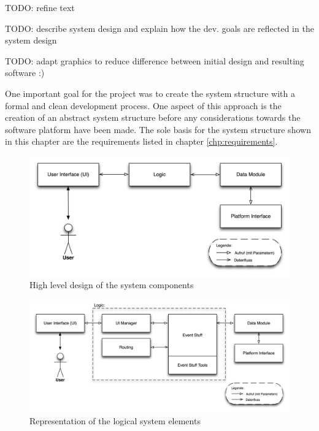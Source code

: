 
TODO: refine text

TODO: describe system design and explain how the dev. goals are reflected in the system design

TODO: adapt graphics to reduce difference between initial design and resulting software :)

One important goal for the project was to create the system structure with a formal and clean development process. One aspect of this approach is the creation of an abstract system structure before any considerations towards the software platform have been made. The sole basis for the system structure shown in this chapter are the requirements listed in chapter \ref{chp:requirements}.

\begin{figure}[h!]
\centering
\includegraphics[width=16cm]{pics/top_level_design.png}
\caption{High level design of the system components}
\label{high_level_design}
\end{figure}

\begin{figure}[h!]
\centering
\includegraphics[width=16cm]{pics/logic.png}
\caption{Representation of the logical system elements}
\label{logic}
\end{figure}

